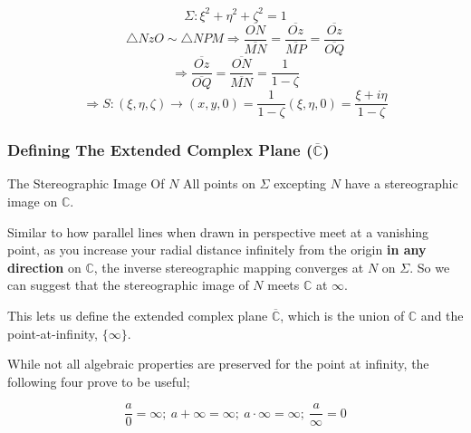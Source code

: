 \documentclass[24pt]{beamer}
\begin{document}
\begin{frame}
\egroup

\vspace{-10pt}
\[\boxed{\Sigma:\xi^2+\eta^2+\zeta^2=1}\]
\vspace{-10pt}
\[\triangle NzO\sim\triangle NPM\Rightarrow\frac{\overline{ON}}{\overline{MN}}=\frac{\overline{Oz}}{\overline{MP}}=\frac{\overline{Oz}}{\overline{OQ}}\]
\vspace{-5pt}
\[\Rightarrow\frac{\overline{Oz}}{\overline{OQ}}=\frac{\overline{ON}}{\overline{MN}}=\frac{1}{1-\zeta}\]
\vspace{-5pt}
\begin{equation}
\Rightarrow S:(\xi,\eta,\zeta)\to(x,y,0)=\frac{1}{1-\zeta}(\xi,\eta,0)=\frac{\xi+i\eta}{1-\zeta}
\end{equation}
\end{frame}

\begin{frame}
\frametitle{Defining The Extended Complex Plane ($\overline{\mathbb{C}}$)}

\begin{block}{The Stereographic Image Of $N$}
All points on $\Sigma$ excepting $N$ have a stereographic image on $\mathbb{C}$. 

\vspace{10pt}

Similar to how parallel lines when drawn in perspective meet at a vanishing point, as you increase your radial distance infinitely from the origin {\bf{}in any direction} on $\mathbb{C}$, the inverse stereographic mapping converges at $N$ on $\Sigma$. So we can suggest that the stereographic image of $N$ meets $\mathbb{C}$ at $\infty$.

\vspace{10pt}

This lets us define the extended complex plane $\overline{\mathbb{C}}$, which is the union of $\mathbb{C}$ and the point-at-infinity, $\{\infty\}$.

\vspace{10pt}

While not all algebraic properties are preserved for the point at infinity, the following four prove to be useful;

\[\frac{a}{0}=\infty;\ a+\infty=\infty;\ a\cdot\infty=\infty;\ \frac{a}{\infty}=0\]

\end{block}
\end{frame}
\end{document}
